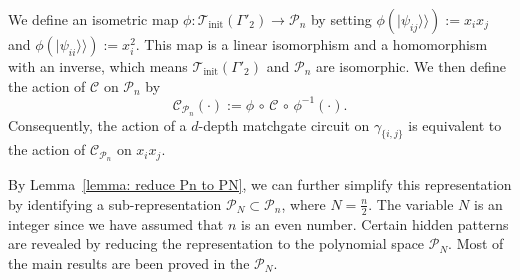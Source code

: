 \documentclass[journal=jctcce,a4paper,manuscript=article]{achemso}
\newcommand{\supket}[1]{|#1 \rangle\rangle}
\newcommand{\Tcal}{\mathcal{T}}
\begin{document}
We define an isometric map \(\phi: \Tcal_\text{init}(\Gamma'_2) \to
\mathcal{P}_n\) by setting \(\phi(\supket{\psi_{ij}}) := x_i x_j\) and
\(\phi(\supket{\psi_{ii}}) := x_i^2\). This map is a linear isomorphism and a
homomorphism with an inverse, which means \(\Tcal_\text{init}(\Gamma'_2)\) and
\(\mathcal{P}_n\) are isomorphic. We then define the action of \(\mathcal{C}\)
on \(\mathcal{P}_n\) by
\begin{equation}
  \mathcal{C}_{\mathcal{P}_n}(\cdot) := \phi \,\circ\, \mathcal{C} \,\circ\, \phi^{-1} (\cdot).
\end{equation}
Consequently, the action of a \(d\)-depth matchgate circuit on \(\gamma_{\{i,j\}}\) is equivalent to the action of \(\mathcal{C}_{\mathcal{P}_n}\) on \(x_i x_j\).

By Lemma~\ref{lemma: reduce Pn to PN}, we can further simplify this
representation by identifying a sub-representation \(\mathcal{P}_N \subset
\mathcal{P}_n\), where \(N = \tfrac{n}{2}\). The variable \(N\) is an integer
since we have assumed that $n$ is an even number. Certain hidden patterns are
revealed by reducing the representation to the polynomial space
$\mathcal{P}_N$. Most of the main results are been proved in the
$\mathcal{P}_N$.
\end{document}
